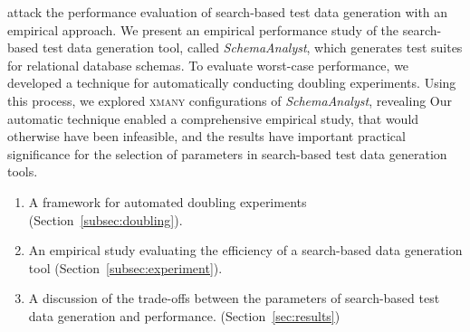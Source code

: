 attack the performance evaluation of search-based test data generation with an empirical
approach. We present an empirical performance study of the search-based test data generation tool, called
\textit{SchemaAnalyst}, which generates test suites for relational database schemas. To evaluate worst-case performance,
we developed a technique for automatically conducting doubling experiments. Using this process, we explored
\textsc{xmany} configurations of \textit{SchemaAnalyst}, revealing 
Our automatic technique enabled a comprehensive empirical study, that would otherwise have been infeasible, and the
results have important practical significance for the selection of parameters in search-based test data generation
tools.

\begin{enumerate}
  \item A framework for automated doubling experiments
    (Section~\ref{subsec:doubling}).
  \item An empirical study evaluating the efficiency of a search-based
    data generation tool (Section~\ref{subsec:experiment}).
  \item A discussion of the trade-offs between the parameters of
    search-based test data generation and performance.
    (Section~\ref{sec:results})
  \end{enumerate}
